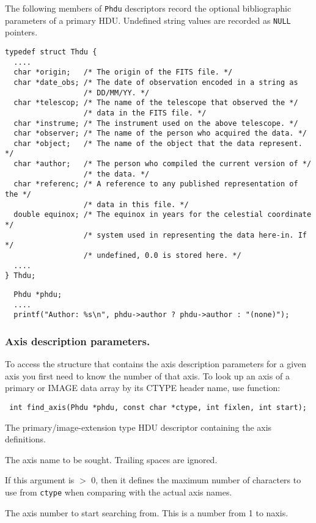 The following members of \verb`Phdu` descriptors record the optional
bibliographic parameters of a primary HDU. Undefined string values are
recorded as \verb`NULL` pointers.

\begin{verbatim}
typedef struct Thdu {
  ....
  char *origin;   /* The origin of the FITS file. */
  char *date_obs; /* The date of observation encoded in a string as
                  /* DD/MM/YY. */
  char *telescop; /* The name of the telescope that observed the */
                  /* data in the FITS file. */
  char *instrume; /* The instrument used on the above telescope. */
  char *observer; /* The name of the person who acquired the data. */
  char *object;   /* The name of the object that the data represent. */
  char *author;   /* The person who compiled the current version of */
                  /* the data. */
  char *referenc; /* A reference to any published representation of the */
                  /* data in this file. */
  double equinox; /* The equinox in years for the celestial coordinate */
                  /* system used in representing the data here-in. If */
                  /* undefined, 0.0 is stored here. */
  ....
} Thdu;
\end{verbatim}


\begin{verbatim}
  Phdu *phdu;
  ....
  printf("Author: %s\n", phdu->author ? phdu->author : "(none)");
\end{verbatim}

\subsubsection{Axis description parameters.}

To access the structure that contains the axis description parameters
for a given axis you first need to know the number of that axis. To
look up an axis of a primary or IMAGE data array by its CTYPE
header name, use function:

\label{find_axis}\begin{verbatim}
 int find_axis(Phdu *phdu, const char *ctype, int fixlen, int start);
\end{verbatim}

\begin{arglist}

  The primary/image-extension type HDU descriptor
                    containing the axis definitions.

 The axis name to be sought. Trailing spaces are
                    ignored.

 If this argument is $>$ 0, then it defines the maximum
               number of characters to use from \verb`ctype` when
               comparing with the actual axis names.

 The axis number to start searching from. This is a
              number from 1 to naxis.
 
\end{arglist}


